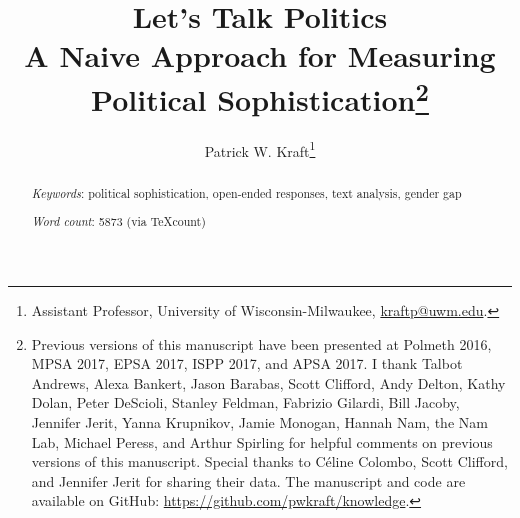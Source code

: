 \documentclass[12pt]{article}
\author{Patrick W. Kraft\footnote{Assistant Professor, University of Wisconsin-Milwaukee, \href{mailto:kraftp@uwm.edu}{kraftp@uwm.edu}.
}}
\title{Let's Talk Politics\\
\large{A Naive Approach for Measuring Political Sophistication}\footnote{Previous versions of this manuscript have been presented at Polmeth 2016, MPSA 2017, EPSA 2017, ISPP 2017, and APSA 2017. I thank Talbot Andrews, Alexa Bankert, Jason Barabas, Scott Clifford, Andy Delton, Kathy Dolan, Peter DeScioli, Stanley Feldman, Fabrizio Gilardi, Bill Jacoby, Jennifer Jerit, Yanna Krupnikov, Jamie Monogan, Hannah Nam, the Nam Lab, Michael Peress, and Arthur Spirling for helpful comments on previous versions of this manuscript. Special thanks to C{\'e}line Colombo, Scott Clifford, and Jennifer Jerit for sharing their data. The manuscript and code are available on GitHub: \url{https://github.com/pwkraft/knowledge}.
}
}
\date{}
\begin{document}
\maketitle
\doublespacing
\thispagestyle{empty}


\hfill
\begin{abstract}\singlespacing
\noindent 


\vspace{\baselineskip}
\noindent \textit{Keywords}: political sophistication, open-ended responses, text analysis, gender gap

\vspace{\baselineskip}
\noindent \textit{Word count}: 5873 (via TeXcount)
\end{abstract}
\hfill

\newpage\setcounter{page}{1}


\clearpage
\singlespacing


\end{document}
